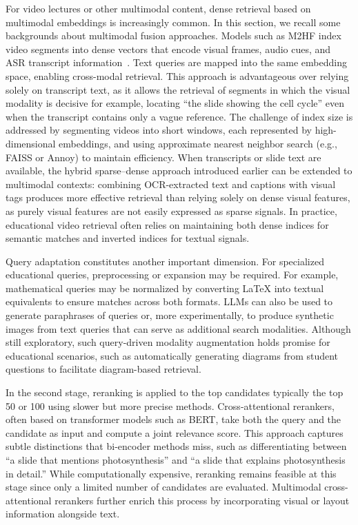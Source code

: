For video lectures or other multimodal content, dense retrieval based on multimodal embeddings is increasingly common. In this section, we recall some backgrounds about multimodal fusion approaches. Models such as M2HF index video segments into dense vectors that encode visual frames, audio cues, and ASR transcript information~\cite{liu2022m2hf}. Text queries are mapped into the same embedding space, enabling cross-modal retrieval. This approach is advantageous over relying solely on transcript text, as it allows the retrieval of segments in which the visual modality is decisive for example, locating ``the slide showing the cell cycle'' even when the transcript contains only a vague reference. The challenge of index size is addressed by segmenting videos into short windows, each represented by high-dimensional embeddings, and using approximate nearest neighbor search (e.g., FAISS or Annoy) to maintain efficiency. When transcripts or slide text are available, the hybrid sparse--dense approach introduced earlier can be extended to multimodal contexts: combining OCR-extracted text and captions with visual tags produces more effective retrieval than relying solely on dense visual features, as purely visual features are not easily expressed as sparse signals. In practice, educational video retrieval often relies on maintaining both dense indices for semantic matches and inverted indices for textual signals.


Query adaptation constitutes another important dimension. For specialized educational queries, preprocessing or expansion may be required. For example, mathematical queries may be normalized by converting LaTeX into textual equivalents to ensure matches across both formats. LLMs can also be used to generate paraphrases of queries or, more experimentally, to produce synthetic images from text queries that can serve as additional search modalities. Although still exploratory, such query-driven modality augmentation holds promise for educational scenarios, such as automatically generating diagrams from student questions to facilitate diagram-based retrieval.

In the second stage, reranking is applied to the top candidates typically the top 50 or 100 using slower but more precise methods. Cross-attentional rerankers, often based on transformer models such as BERT, take both the query and the candidate as input and compute a joint relevance score. This approach captures subtle distinctions that bi-encoder methods miss, such as differentiating between “a slide that mentions photosynthesis” and “a slide that explains photosynthesis in detail.” While computationally expensive, reranking remains feasible at this stage since only a limited number of candidates are evaluated. Multimodal cross-attentional rerankers further enrich this process by incorporating visual or layout information alongside text.


